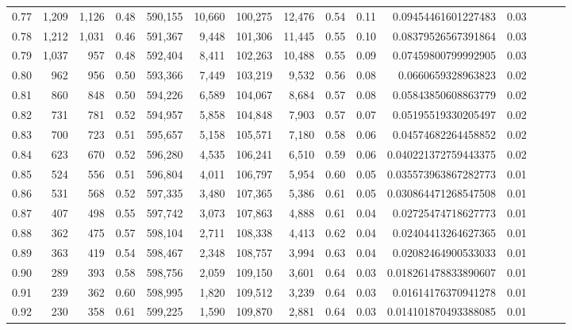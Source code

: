 \begin{tabular}{rrrrrrrrrrrrrrr}
0.77 &   1,209 &  1,126 &  0.48 &  590,155 &   10,660 &  100,275 &   12,476 &  0.54 &  0.11 &   0.09454461601227483 &      0.03 \\
0.78 &   1,212 &  1,031 &  0.46 &  591,367 &    9,448 &  101,306 &   11,445 &  0.55 &  0.10 &   0.08379526567391864 &      0.03 \\
0.79 &   1,037 &    957 &  0.48 &  592,404 &    8,411 &  102,263 &   10,488 &  0.55 &  0.09 &   0.07459800799992905 &      0.03 \\
0.80 &     962 &    956 &  0.50 &  593,366 &    7,449 &  103,219 &    9,532 &  0.56 &  0.08 &    0.0660659328963823 &      0.02 \\
0.81 &     860 &    848 &  0.50 &  594,226 &    6,589 &  104,067 &    8,684 &  0.57 &  0.08 &   0.05843850608863779 &      0.02 \\
0.82 &     731 &    781 &  0.52 &  594,957 &    5,858 &  104,848 &    7,903 &  0.57 &  0.07 &   0.05195519330205497 &      0.02 \\
0.83 &     700 &    723 &  0.51 &  595,657 &    5,158 &  105,571 &    7,180 &  0.58 &  0.06 &   0.04574682264458852 &      0.02 \\
0.84 &     623 &    670 &  0.52 &  596,280 &    4,535 &  106,241 &    6,510 &  0.59 &  0.06 &  0.040221372759443375 &      0.02 \\
0.85 &     524 &    556 &  0.51 &  596,804 &    4,011 &  106,797 &    5,954 &  0.60 &  0.05 &  0.035573963867282773 &      0.01 \\
0.86 &     531 &    568 &  0.52 &  597,335 &    3,480 &  107,365 &    5,386 &  0.61 &  0.05 &  0.030864471268547508 &      0.01 \\
0.87 &     407 &    498 &  0.55 &  597,742 &    3,073 &  107,863 &    4,888 &  0.61 &  0.04 &   0.02725474718627773 &      0.01 \\
0.88 &     362 &    475 &  0.57 &  598,104 &    2,711 &  108,338 &    4,413 &  0.62 &  0.04 &   0.02404413264627365 &      0.01 \\
0.89 &     363 &    419 &  0.54 &  598,467 &    2,348 &  108,757 &    3,994 &  0.63 &  0.04 &   0.02082464900533033 &      0.01 \\
0.90 &     289 &    393 &  0.58 &  598,756 &    2,059 &  109,150 &    3,601 &  0.64 &  0.03 &  0.018261478833890607 &      0.01 \\
0.91 &     239 &    362 &  0.60 &  598,995 &    1,820 &  109,512 &    3,239 &  0.64 &  0.03 &   0.01614176370941278 &      0.01 \\
0.92 &     230 &    358 &  0.61 &  599,225 &    1,590 &  109,870 &    2,881 &  0.64 &  0.03 &  0.014101870493388085 &      0.01 \\

\end{tabular}
